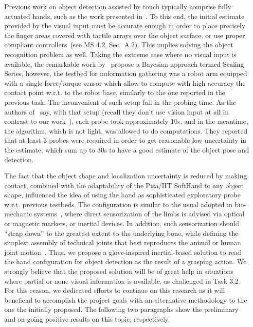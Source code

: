 \documentclass[a4paper,11pt,pdf]{pacmanreport}
\begin{document}
Previous work on object detection assisted by touch typically comprise fully actuated hands, such as the work presented in~\cite{Bimbo2013Combining}. To this end, the initial estimate provided by the visual input must be accurate enough in order to place precisely the finger areas covered with tactile arrays over the object surface, or use proper compliant controllers~(see MS 4.2, Sec.~A.2). This implies solving the object recognition problem as well. Taking the extreme case where no visual input is available, the remarkable work by~\cite{Petrovskaya2011Global} propose a Bayesian approach termed Scaling Series, however, the testbed for imformation gathering was a robot arm equipped with a single force/torque sensor which allow to compute with high accuracy the contact point w.r.t. to the robot base, similarly to the one reported in the previous task. The inconvenient of such setup fall in the probing time. As the authors of~\cite{Petrovskaya2011Global} say, with that setup (recall they don't use vision input at all in contrast to our work~\cite{Rosales2014Active}), each probe took approximately $10$s, and in the meantime, the algorithm, which is not light, was allowed to do computations. They reported that at least $3$ probes were required in order to get reasonable low uncertainty in the estimate, which sum up to $30$s to have a good estimate of the object pose and detection.

The fact that the object shape and localization uncertainty is reduced by making contact, combined with the adaptability of the Pisa/IIT SoftHand to any object shape, influenced the idea of using the hand as sophisticated exploratory probe w.r.t. previous testbeds. The configuration is similar to the usual adopted in bio-mechanic systems~\cite{Cappozzo1995}, where direct sensorization of the limbs is advised via optical or magnetic markers, or inertial devices. In addition, such sensorization should ``strap down'' to the greatest extent to the underlying bone, while defining the simplest assembly of technical joints that best reproduces the animal or human joint motion~\cite{Lucchetti1998}. Thus, we propose a glove-inspired inertial-based solution to read the hand configuration for object detection as the result of a grasping action. We strongly believe that the proposed solution will be of great help in situations where partial or none visual information is available, as challenged in Task 3.2. For this reason, we dedicated efforts to continue on this research as it will beneficial to accomplish the project goals with an alternative methodology to the one the initially proposed. The following two paragraphs show the preliminary and on-going positive results on this topic, respectively.
\end{document}
